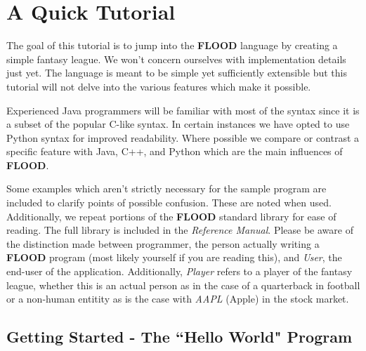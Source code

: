 \documentclass[12pt]{report}
\begin{document}
\chapter{A Quick Tutorial}

\begin{doublespace}
The goal of this tutorial is to jump into the \textbf{FLOOD} language by creating a simple fantasy league. We won't concern ourselves with implementation details just yet. The language is meant to be simple yet sufficiently extensible but this tutorial will not delve into the various features which make it possible. 

Experienced Java programmers will be familiar with most of the syntax since it is a subset of the popular C-like syntax. In certain instances we have opted to use Python syntax for improved readability. Where possible we compare or contrast a specific feature with Java, C++, and Python which are the main influences of \textbf{FLOOD}. 

Some examples which aren't strictly necessary for the sample program are included to clarify points of possible confusion. These are noted when used. Additionally, we repeat portions of the \textbf{FLOOD} standard library for ease of reading. The full library is included in the \textit{Reference Manual}. Please be aware of the distinction made between programmer, the person actually writing a \textbf{FLOOD} program (most likely yourself if you are reading this), and \textit{User}, the end-user of the application. Additionally, \textit{Player} refers to a player of the fantasy league, whether this is an actual person as in the case of a quarterback in football or a non-human entitity as is the case with \textit{AAPL} (Apple) in the stock market.
\end{doublespace}

\section{Getting Started - The ``Hello World" Program}
\end{document}
